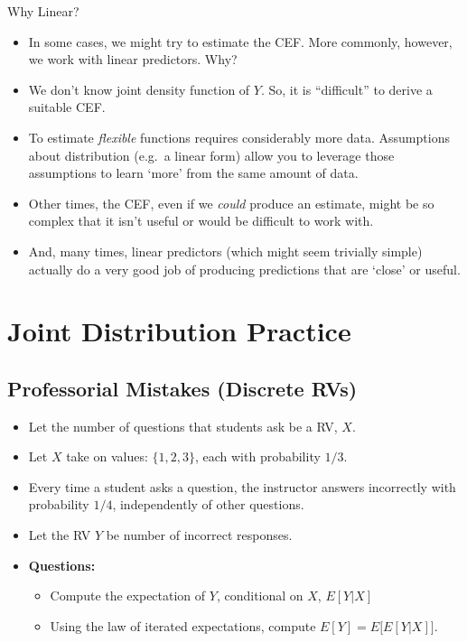 \documentclass[
  letterpaper,
  DIV=11,
  numbers=noendperiod]{scrreprt}
\providecommand{\tightlist}{%
  \setlength{\itemsep}{0pt}\setlength{\parskip}{0pt}}\usepackage{longtable,booktabs,array}
\begin{document}
Why Linear?

\begin{itemize}
\tightlist
\item
  In some cases, we might try to estimate the CEF. More commonly,
  however, we work with linear predictors. Why?
\end{itemize}

\begin{itemize}
\tightlist
\item
  We don't know joint density function of \(Y\). So, it is ``difficult''
  to derive a suitable CEF.
\item
  To estimate \emph{flexible} functions requires considerably more data.
  Assumptions about distribution (e.g.~a linear form) allow you to
  leverage those assumptions to learn `more' from the same amount of
  data.
\item
  Other times, the CEF, even if we \emph{could} produce an estimate,
  might be so complex that it isn't useful or would be difficult to work
  with.
\item
  And, many times, linear predictors (which might seem trivially simple)
  actually do a very good job of producing predictions that are `close'
  or useful.
\end{itemize}

\section{Joint Distribution Practice}\label{joint-distribution-practice}

\subsection{Professorial Mistakes (Discrete
RVs)}\label{professorial-mistakes-discrete-rvs}

\begin{itemize}
\item
  Let the number of questions that students ask be a RV, \(X\).\\
\item
  Let \(X\) take on values: \(\{1, 2, 3\}\), each with probability
  \(1/3\).\\
\item
  Every time a student asks a question, the instructor answers
  incorrectly with probability \(1/4\), independently of other
  questions.
\item
  Let the RV \(Y\) be number of incorrect responses.
\item
  \textbf{Questions:}

  \begin{itemize}
  \tightlist
  \item
    Compute the expectation of \(Y\), conditional on \(X\), \(E[Y|X]\)
  \item
    Using the law of iterated expectations, compute
    \(E[Y] = E\big[E[Y|X]\big]\).
  \end{itemize}
\end{itemize}
\end{document}
